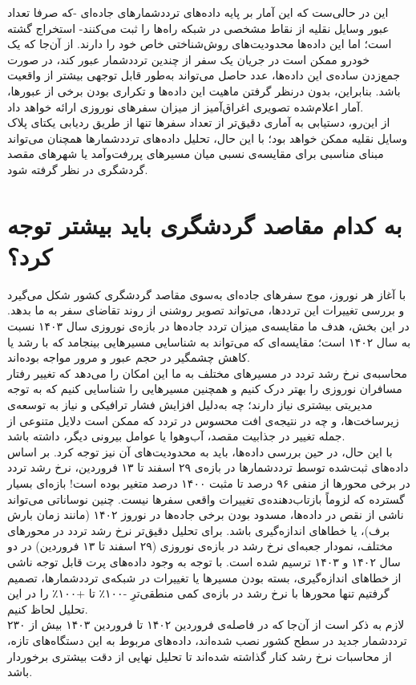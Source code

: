 \documentclass[a4paper, 12pt]{article}
\begin{document}
این در حالی‌ست که این آمار بر پایه داده‌های ترددشمارهای جاده‌ای -که صرفا تعداد عبور وسایل نقلیه از نقاط مشخصی در شبکه راه‌ها را ثبت می‌کنند- استخراج  گشته است؛ اما این داده‌ها محدودیت‌های روش‌شناختی خاص خود را دارند. از آن‌جا که یک خودرو ممکن است در جریان یک سفر از چندین ترددشمار عبور کند، در صورت جمع‌زدن ساده‌ی این داده‌ها، عدد حاصل می‌تواند به‌طور قابل توجهی بیشتر از واقعیت باشد. بنابراین، بدون درنظر گرفتن ماهیت این داده‌ها و تکراری بودن برخی از عبورها، آمار اعلام‌شده تصویری اغراق‌آمیز از میزان سفرهای نوروزی ارائه خواهد داد.
\\

از این‌رو، دستیابی به آماری دقیق‌تر از تعداد سفرها تنها از طریق ردیابی یکتای پلاک وسایل نقلیه ممکن خواهد بود؛ با این حال، تحلیل داده‌های ترددشمارها همچنان می‌تواند مبنای مناسبی برای مقایسه‌ی نسبی میان مسیرهای پررفت‌وآمد یا شهرهای مقصد گردشگری در نظر گرفته شود.


\section{به کدام مقاصد گردشگری باید بیشتر توجه کرد؟}
با آغاز هر نوروز، موج سفرهای جاده‌ای به‌سوی مقاصد گردشگری کشور شکل می‌گیرد و بررسی تغییرات این ترددها، می‌تواند تصویر روشنی از روند تقاضای سفر به ما بدهد. در این بخش، هدف ما مقایسه‌ی میزان تردد جاده‌ها در بازه‌ی نوروزی سال ۱۴۰۳ نسبت به سال ۱۴۰۲ است؛ مقایسه‌ای که می‌تواند به شناسایی مسیرهایی بینجامد که با رشد یا کاهش چشمگیر در حجم عبور و مرور مواجه بوده‌اند.
\\
محاسبه‌ی نرخ رشد تردد در مسیرهای مختلف به ما این امکان را می‌دهد که تغییر رفتار مسافران نوروزی را بهتر درک کنیم و همچنین مسیرهایی را شناسایی کنیم که به توجه مدیریتی بیشتری نیاز دارند؛ چه به‌دلیل افزایش فشار ترافیکی و نیاز به توسعه‌ی زیرساخت‌ها، و چه در نتیجه‌ی افت محسوس در تردد که ممکن است دلایل متنوعی از جمله تغییر در جذابیت مقصد، آب‌و‌هوا یا عوامل بیرونی دیگر، داشته باشد.
\\

با این حال، در حین بررسی داده‌ها، باید به محدودیت‌های آن نیز توجه کرد. بر اساس داده‌های ثبت‌شده توسط ترددشمارها در بازه‌ی ۲۹ اسفند تا ۱۳ فروردین، نرخ رشد تردد در برخی محورها از منفی ۹۶ درصد تا مثبت ۱۴۰۰ درصد متغیر بوده است! بازه‌ای بسیار گسترده که لزوماً بازتاب‌دهنده‌ی تغییرات واقعی سفرها نیست. چنین نوساناتی می‌تواند ناشی از نقص در داده‌ها، مسدود بودن برخی جاده‌ها در نوروز ۱۴۰۲ (مانند زمان بارش برف)، یا خطاهای اندازه‌گیری باشد.
\newpage
برای تحلیل دقیق‌تر نرخ رشد تردد در محورهای مختلف، نمودار جعبه‌ای نرخ رشد در بازه‌ی نوروزی (۲۹ اسفند تا ۱۳ فروردین) در دو سال ۱۴۰۲ و ۱۴۰۳ ترسیم شده است. با توجه به وجود داده‌های پرت قابل توجه ناشی از خطاهای اندازه‌گیری، بسته بودن مسیرها یا تغییرات در شبکه‌ی ترددشمارها، تصمیم گرفتیم تنها محورها با نرخ رشد در بازه‌ی کمی منطقی‌ترِ -۱۰۰٪ تا +۱۰۰٪ را در این تحلیل لحاظ کنیم.
\\
لازم به ذکر است از آن‌جا که در فاصله‌ی فروردین ۱۴۰۲ تا فروردین ۱۴۰۳ بیش از ۲۳۰ ترددشمار جدید در سطح کشور نصب شده‌اند، داده‌های مربوط به این دستگاه‌های تازه، از محاسبات نرخ رشد کنار گذاشته شده‌اند تا تحلیل نهایی از دقت بیشتری برخوردار باشد.
\end{document}
